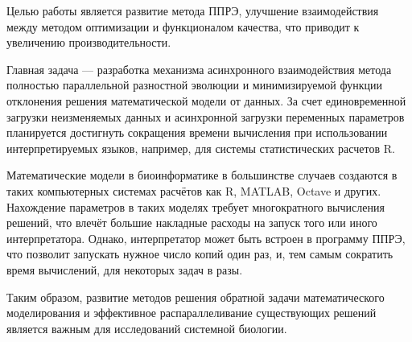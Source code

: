 Целью работы является развитие метода ППРЭ,
улучшение взаимодействия между
методом оптимизации и функционалом качества,
что приводит к увеличению производительности.

Главная задача —
разработка механизма асинхронного
взаимодействия метода полностью
параллельной разностной эволюции и
минимизируемой функции отклонения
решения математической модели от
данных. За счет единовременной загрузки
неизменяемых данных и асинхронной
загрузки переменных параметров планируется
достигнуть сокращения времени вычисления
при использовании интерпретируемых
языков, например, для системы статистических
расчетов R.

Математические модели в биоинформатике
в большинстве случаев создаются
в таких компьютерных системах расчётов
как R, MATLAB, Octave и других.
Нахождение параметров в таких моделях
требует многократного вычисления решений,
что влечёт большие накладные расходы на запуск
того или иного интерпретатора.
Однако, интерпретатор может быть встроен в программу ППРЭ,
что позволит запускать нужное число копий один раз,
и, тем самым сократить время вычислений, для некоторых задач в разы.

Таким образом,
развитие методов решения обратной задачи математического моделирования
и эффективное распараллеливание существующих решений
является важным для исследований системной биологии.

